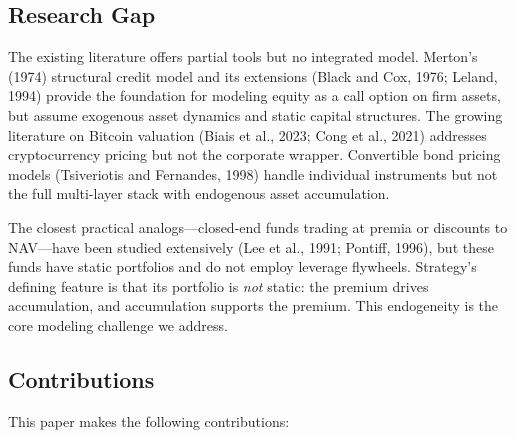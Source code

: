 \subsection{Research Gap}

The existing literature offers partial tools but no integrated model. Merton's (1974) structural credit model and its extensions (Black and Cox, 1976; Leland, 1994) provide the foundation for modeling equity as a call option on firm assets, but assume exogenous asset dynamics and static capital structures. The growing literature on Bitcoin valuation (Biais et al., 2023; Cong et al., 2021) addresses cryptocurrency pricing but not the corporate wrapper. Convertible bond pricing models (Tsiveriotis and Fernandes, 1998) handle individual instruments but not the full multi-layer stack with endogenous asset accumulation.

The closest practical analogs---closed-end funds trading at premia or discounts to NAV---have been studied extensively (Lee et al., 1991; Pontiff, 1996), but these funds have static portfolios and do not employ leverage flywheels. Strategy's defining feature is that its portfolio is \emph{not} static: the premium drives accumulation, and accumulation supports the premium. This endogeneity is the core modeling challenge we address.

\subsection{Contributions}

This paper makes the following contributions:

